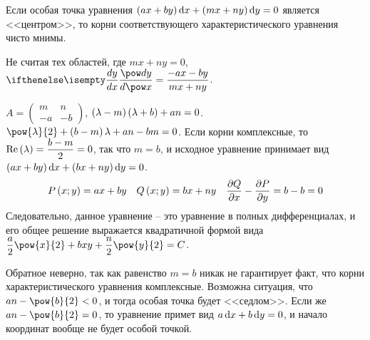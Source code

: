 \documentclass[a5paper,10pt]{article}
\begin{document}
Если особая точка уравнения $\br{ax + by} \di x + \br{mx + ny} \di y = 0$ является <<центром>>,
то корни соответствующего характеристического уравнения чисто мнимы.

Не считая тех областей, где $mx + ny = 0$, $\der{y}{x} = \dfrac {-ax - by} {mx + ny}$.

$A = \begin{pmatrix} m & n \\ -a & -b \end{pmatrix}$,
$\left(\hspace{0.01em}\lambda - m\hspace{0.01em}\right)\left(\hspace{0.01em}\lambda + b\hspace{0.01em}\right) + an = 0$.
$\pow{\lambda}{2} + \br{b - m}\lambda + an - bm = 0$. Если корни комплексные, 
то $\operatorname{Re}\left(\hspace{0.01em}\lambda\hspace{0.01em}\right) = \dfrac {b - m} {2} = 0$,
так что $m = b$, и исходное уравнение принимает вид 
$\br{ax + by} \di x + \br{bx + ny} \di y = 0$.
\begin{align*}
    P\left(\hspace{0.01em}x; y\hspace{0.01em}\right) = ax + by &&
    Q\left(\hspace{0.01em}x; y\hspace{0.01em}\right) = bx + ny &&
    \dfrac{\partial Q}{\partial x} - \dfrac{\partial P}{\partial y} = b - b = 0
\end{align*}
Следовательно, данное уравнение -- это уравнение в полных дифференциалах, и его общее решение
выражается квадратичной формой вида
$\dfrac {a}{2} \pow{x}{2} + bxy + \dfrac {n} {2} \pow{y}{2} = C$.

Обратное неверно, так как равенство $m = b$ никак не гарантирует факт, 
что корни характеристического уравнения комплексные. Возможна ситуация, что 
$an - \pow{b}{2} < 0$, и тогда особая точка будет <<седлом>>. Если же $an - \pow{b}{2} = 0$, 
то уравнение примет вид $a \di x + b \di y = 0$, и начало координат вообще не будет
особой точкой.
\end{document}
